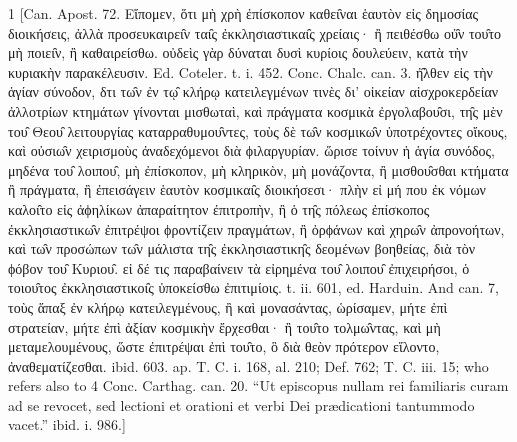 1
[Can. Apost. 72. Εἴπομεν, ὅτι μὴ χρὴ ἐπίσκοπον καθει̑ναι ἑαυτὸν εἰς δημοσίας διοικήσεις, ἀλλὰ προσευκαιρει̑ν ται̑ς ἐκκλησιαστικαι̑ς χρείαις· ἢ πειθέσθω οὐ̑ν του̑το μὴ ποιει̑ν, ἢ καθαιρείσθω. οὐδεὶς γὰρ δύναται δυσὶ κυρίοις δουλεύειν, κατὰ τὴν κυριακὴν παρακέλευσιν. Ed. Coteler. t. i. 452. Conc. Chalc. can. 3. ἠ̑λθεν εἰς τὴν ἁγίαν σύνοδον, δτι τω̑ν ἐν τῳ̑ κλήρῳ κατειλεγμένων τινὲς δι’ οἰκείαν αἰσχροκερδείαν ἀλλοτρίων κτημάτων γίνονται μισθωταὶ, καὶ πράγματα κοσμικὰ ἐργολαβου̑σι, τη̑ς μὲν του̑ Θεου̑ λειτουργίας καταρραθυμου̑ντες, τοὺς δὲ τω̑ν κοσμικω̑ν ὑποτρέχοντες οἴκους, καὶ οὐσιω̑ν χειρισμοὺς ἀναδεχόμενοι διὰ ϕιλαργυρίαν. ὥρισε τοίνυν ἡ ἁγία συνόδος, μηδένα του̑ λοιπου̑, μὴ ἐπίσκοπον, μὴ κληρικὸν, μὴ μονάζοντα, ἢ μισθου̑σθαι κτήματα ἢ πράγματα, ἢ ἐπεισάγειν ἑαυτὸν κοσμικαι̑ς διοικήσεσι· πλὴν εἰ μή που ἐκ νόμων καλοι̑το εἰς ἀϕηλίκων ἀπαραίτητον ἐπιτροπὴν, ἢ ὁ τη̑ς πόλεως ἐπίσκοπος ἐκκλησιαστικω̑ν ἐπιτρέψοι ϕροντίζειν πραγμάτων, ἢ ὀρϕάνων καὶ χηρω̑ν ἀπρονοήτων, καὶ τω̑ν προσώπων τω̑ν μάλιστα τη̑ς ἐκκλησιαστικη̑ς δεομένων βοηθείας, διὰ τὸν ϕόβον του̑ Κυριου̑. εἰ δέ τις παραβαίνειν τὰ εἰρημένα του̑ λοιπου̑ ἐπιχειρήσοι, ὁ τοιου̑τος ἐκκλησιαστικοι̑ς ὑποκείσθω ἐπιτιμίοις. t. ii. 601, ed. Harduin. And can. 7, τοὺς ἅπαξ ἐν κλήρῳ κατειλεγμένους, ἢ καὶ μονασάντας, ὡρίσαμεν, μήτε ἐπὶ στρατείαν, μήτε ἐπὶ ἀξίαν κοσμικὴν ἔρχεσθαι· ἢ του̑το τολμω̑ντας, καὶ μὴ μεταμελουμένους, ὥστε ἐπιτρέψαι ἐπὶ του̑το, ὃ διὰ θεὸν πρότερον εἵλοντο, ἀναθεματίζεσθαι. ibid. 603. ap. T. C. i. 168, al. 210; Def. 762; T. C. iii. 15; who refers also to 4 Conc. Carthag. can. 20. “Ut episcopus nullam rei familiaris curam ad se revocet, sed lectioni et orationi et verbi Dei prædicationi tantummodo vacet.” ibid. i. 986.]

